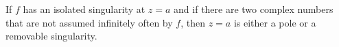 If $f$ has an isolated singularity at $z = a$ and if there are two complex numbers that are not assumed infinitely often by $f$, then $z = a$ is either a pole or a removable singularity.
